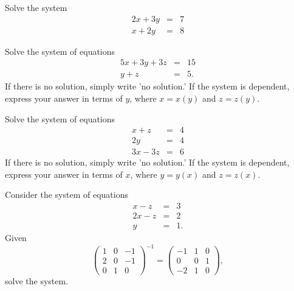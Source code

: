 \documentclass[12pt]{amsart}
\begin{document}
\newpage

\begin{thm}[20 Points]\label{ex2}
  Solve the system
  \begin{eqnarray*}
    2x + 3y &=& 7\\
    x + 2y &=& 8
  \end{eqnarray*}
\end{thm}

\newpage

\begin{thm}[20 Points]\label{ex3}
  Solve the system of equations
  \begin{eqnarray*}
    5x + 3y + 3z &=& 15\\
    y + z &=& 5.
  \end{eqnarray*}
  If there is no solution, simply write 'no solution.'  If the system is dependent, express your answer in terms of $y$, where $x = x(y)$ and $z = z(y)$.
\end{thm}

\newpage

\begin{thm}[20 Points]\label{ex4}
  Solve the system of equations
  \begin{eqnarray*}
    x + z &=& 4\\
    2y &=& 4\\
    3x - 3z &=& 6
  \end{eqnarray*}
  If there is no solution, simply write 'no solution.'  If the system is dependent, express your answer in terms of $x$, where $y = y(x)$ and $z = z(x)$.
\end{thm}


\newpage

\begin{thm}[20 Points]\label{ex5}
  Consider the system of equations
  \begin{eqnarray*}
    x - z &=& 3\\
    2x - z &=& 2\\
    y &=& 1.
  \end{eqnarray*}
  Given  
  $$\left(\begin{array}{ccc}
    1 & 0 & -1\\
    2 & 0 & -1\\
    0 & 1 & 0
  \end{array}\right)^{-1} = \left(\begin{array}{ccc}
    -1 & 1 & 0\\
    0 & 0 & 1\\
    -2 & 1 & 0
  \end{array}\right),$$
  solve the system.
\end{thm}


\end{document}
